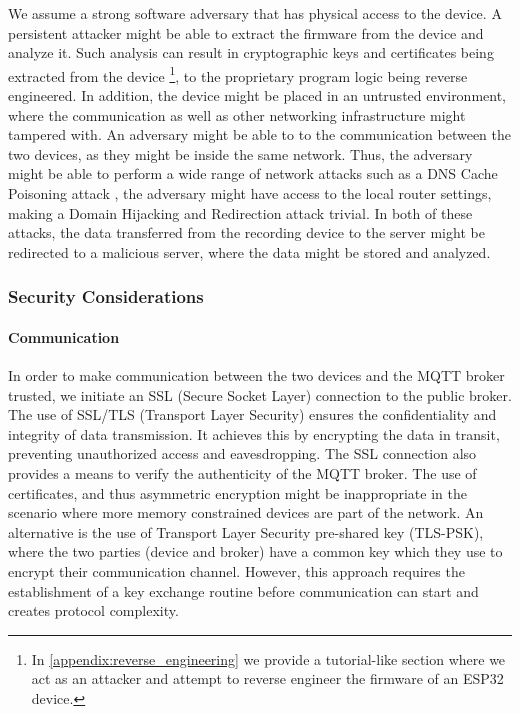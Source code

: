 \documentclass[conference]{IEEEtran}
\begin{document}
We assume a strong software adversary that has physical access to the device.
A persistent attacker might be able to extract the firmware from the device and
analyze it. Such analysis can result in cryptographic keys and certificates being extracted from the device
\footnote{In \cref{appendix:reverse_engineering} we provide a tutorial-like section where we act as an attacker and attempt to reverse engineer the firmware of an ESP32 device.}, 
to the proprietary program logic being reverse engineered.
In addition, the device might be placed in an untrusted environment, where the communication as well 
as other networking infrastructure might tampered with.
An adversary might be able to  to the communication between the two devices,
as they might be inside the same network.
Thus, the adversary might be able to perform a wide range of network attacks such 
as a DNS Cache Poisoning attack \cite{Dissanayake_2018}, the adversary might have access to the local router 
settings, making a Domain Hijacking and Redirection attack \cite{DnsHijacking} trivial. In both of these attacks, 
the data transferred from the recording device to the server might be redirected to a malicious server, 
where the data might be stored and analyzed.

\subsubsection{Security Considerations}

\paragraph{Communication}

In order to make communication between the two devices and the MQTT broker
trusted, we initiate an SSL (Secure Socket Layer) connection to the public broker. 
The use of SSL/TLS (Transport Layer Security)
ensures the confidentiality and integrity of data transmission. 
It achieves this by encrypting the data in transit, preventing
unauthorized access and eavesdropping. The SSL connection also provides a means
to verify the authenticity of the MQTT broker.
The use of certificates, and thus asymmetric encryption might be inappropriate in the scenario where more 
memory constrained devices are part of the network. 
An alternative is the use of Transport Layer Security pre-shared key (TLS-PSK)\cite{rfc4279}, where the two parties 
(device and broker) have a common key which they use to encrypt their communication channel.
However, this approach requires the establishment of a key exchange routine before communication can start
and creates protocol complexity.
\end{document}
